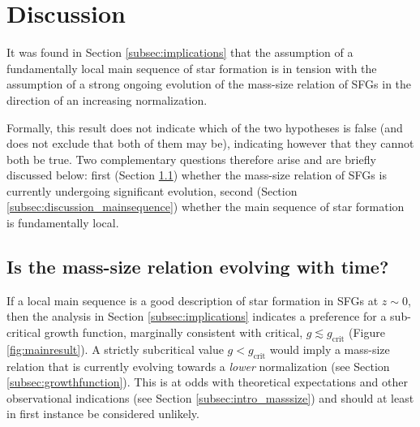 \documentclass[fleqn,usenatbib]{mnras}
\begin{document}

\section[Discussion]{Discussion}\label{sec:Discussion}

It was found in Section \ref{subsec:implications} that the assumption of a fundamentally local main sequence of star formation is in tension with the assumption of a strong ongoing evolution of the mass-size relation of SFGs in the direction of an increasing normalization.

Formally, this result does not indicate which of the two hypotheses is false (and does not exclude that both of them may be), indicating however that they cannot both be true. Two complementary questions therefore arise and are briefly discussed below: first (Section \ref{subsec:discussion_masssize}) whether the mass-size relation of SFGs is currently undergoing significant evolution, second (Section \ref{subsec:discussion_mainsequence}) whether the main sequence of star formation is fundamentally local.

\subsection{Is the mass-size relation evolving with time?}\label{subsec:discussion_masssize}

If a local main sequence is a good description of star formation in SFGs at $z \sim 0$, then the analysis in Section \ref{subsec:implications} indicates a preference for a sub-critical growth function, marginally consistent with critical, $g \lesssim g_\textrm{crit}$ (Figure \ref{fig:mainresult}). A strictly subcritical value $g < g_\textrm{crit}$ would imply a mass-size relation that is currently evolving towards a \emph{lower} normalization (see Section \ref{subsec:growthfunction}). This is at odds with theoretical expectations and other observational indications (see Section \ref{subsec:intro_masssize}) and should at least in first instance be considered unlikely. 
\end{document}
